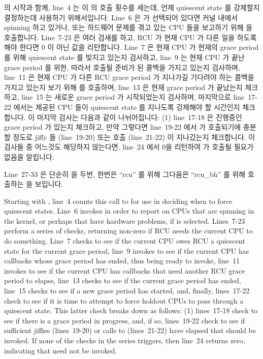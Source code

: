  의 시작과 함께, line~4 는 이  의 호출
횟수를 세는데, 언제 quiescent state 를 강제할지 결정하는데 사용하기
위해서입니다.
Line~6 은  가 선택되어 있다면 커널 내에서
spinning 하고 있거나, 또는 하드웨어 문제를 겪고 있는 CPU 들을 보고하기 위해
 을 호출합니다.
Line~7-23 은 여러 검새를 하고, RCU 가 현재 CPU 가 다른 일을 하도록 해야 한다면
0 이 아닌 값을 리턴합니다.
Line~7 은 현재 CPU 가 현재의 grace period 를 위해 quiescent state 를 빚지고
있는지 검사하고,
line~9 는 현재 CPU 가 끝난 grace period 를 위한, 따라서 호출될 준비가 된 콜백을
가지고 있는지 검사하며,
line~11 은 현재 CPU 가 다른 RCU grace period 가 지나가길 기다려야 하는 콜백을
가지고 있는지 보기 위해  를 호출하며,
line~13 은 현재 grace period 가 끝났는지 체크하고,
line~15 는 새로운 grace period 가 시작되었는지 검사하며,
마지막으로 line~17-22 에서는 제공된 CPU 들이 quiescent state 를 지나도록
강제해야 할 시간인지 체크합니다.
이 마지막 검사는 다음과 같이 나뉘어집니다: (1) line~17-18 은 진행중인 grace
period 가 있는지 체크하고, 만약 그렇다면 line~19-22 에서
 가 호출되기에 충분할 정도로 jiffy 들 (line~19-20)
또는  호출 (line~21-22) 이 지나갔는지 체크합니다.
이 검사들 중 어느것도 해당하지 않는다면, line~24 에서 0을 리턴하여
 가 호출될 필요가 없음을 알립니다.

Line~27-33 은 단순히  을 두번, 한번은 ``rcu'' 를 위해
그다음은 ``rcu\_bh'' 를 위해 호출하는  을 보입니다.
\iffalse

Starting with , line~4 counts this call to
 for use in deciding when to force quiescent states.
Line~6 invokes  in order to report on CPUs
that are spinning in the kernel, or perhaps that have hardware problems,
if  is selected.
Lines~7-23 perform a series of checks, returning non-zero if RCU
needs the current CPU to do something.
Line~7 checks to see if the current CPU owes RCU a quiescent state for the
current grace period,
line~9 invokes  to see if
the current CPU has callbacks whose grace period has ended, thus being
ready to invoke,
line~11 invokes  to see if the current
CPU has callbacks that need another RCU grace period to elapse,
line~13 checks to see if the current grace period has ended,
line~15 checks to see if a new grace period has started,
and, finally, lines~17-22 check to see if it is time to attempt
to force holdout CPUs to pass through a quiescent state.
This latter check breaks down as follows: (1) lines~17-18 check to see
if there is a grace period in progress, and, if so, lines~19-22
check to see if sufficient jiffies (lines~19-20) or calls to
 (lines~21-22) have elapsed that
 should be invoked.
If none of the checks in the series triggers, then line~24 returns
zero, indicating that  need not be invoked.


